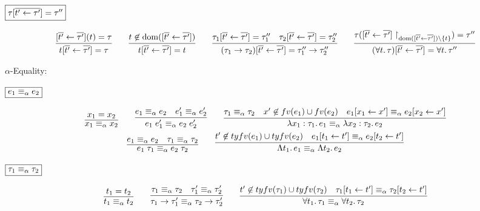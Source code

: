 $\fbox{$\tau[\overline{t' \gets \tau'}] = \tau''$}$

\begin{gather*}
  \infer{t[\overline{t'} \assign \overline{\tau'}] = \tau}{
    [\overline{t'} \assign \overline{\tau'}](t) = \tau
  }
  \hspace{2em}
  \infer{t[\overline{t'} \assign \overline{\tau'}] = t}{
    t \not\in \dom([\overline{t'} \assign \overline{\tau'}])
  }
  \hspace{2em}
  \infer{(\tau_1 \to \tau_2)[\overline{t'} \assign \overline{\tau'}] = \tau''_1 \to \tau''_2}{
    \tau_1[\overline{t'} \assign \overline{\tau'}] = \tau''_1
    &
    \tau_2[\overline{t'} \assign \overline{\tau'}] = \tau''_2
  }
  \hspace{2em}
  \infer{(\forall t\ldotp \tau)[\overline{t'} \assign \overline{\tau'}] = \forall t\ldotp \tau''}{
    \tau([\overline{t'} \assign \overline{\tau'}]\restrict_{\dom([\overline{t'} \assign \overline{\tau'}]) \rcomplement \{t\}}) = \tau''
  }
\end{gather*}

$\alpha$-Equality:

$\fbox{$e_1 \equiv_\alpha e_2$}$

\begin{gather*}
  \infer{x_1 \equiv_\alpha x_2}{
    x_1 = x_2
  }
  \hspace{2em}
  \infer{e_1\; e'_1 \equiv_\alpha e_2\; e'_2}{
    e_1 \equiv_\alpha e_2
    &
    e'_1 \equiv_\alpha e'_2
  }
  \hspace{2em}
  \infer{\lambda x_1: \tau_1\ldotp e_1 \equiv_\alpha \lambda x_2: \tau_2\ldotp e_2}{
    \tau_1 \equiv_\alpha \tau_2
    &
    x' \not\in \freevar(e_1) \cup \freevar(e_2)
    &
    e_1[x_1 \assign x'] \equiv_\alpha e_2[x_2 \assign x']
  }
  \\
  \infer{e_1\; \tau_1 \equiv_\alpha e_2\; \tau_2}{
    e_1 \equiv_\alpha e_2
    &
    \tau_1 \equiv_\alpha \tau_2
  }
  \hspace{2em}
  \infer{\Lambda t_1\ldotp e_1 \equiv_\alpha \Lambda t_2\ldotp e_2}{
    t' \not\in \typefreevar(e_1) \cup \typefreevar(e_2)
    &
    e_1[t_1 \assign t'] \equiv_\alpha e_2[t_2 \assign t']
  }
\end{gather*}

$\fbox{$\tau_1 \equiv_\alpha \tau_2$}$

\begin{gather*}
  \infer{t_1 \equiv_\alpha t_2}{
    t_1 = t_2
  }
  \hspace{2em}
  \infer{\tau_1 \to \tau'_1 \equiv_\alpha \tau_2 \to \tau'_2}{
    \tau_1 \equiv_\alpha \tau_2
    &
    \tau'_1 \equiv_\alpha \tau'_2
  }
  \hspace{2em}
  \infer{\forall t_1\ldotp \tau_1 \equiv_\alpha \forall t_2\ldotp \tau_2}{
    t' \not\in \typefreevar(\tau_1) \cup \typefreevar(\tau_2)
    &
    \tau_1[t_1 \assign t'] \equiv_\alpha \tau_2[t_2 \assign t']
  }
\end{gather*}

